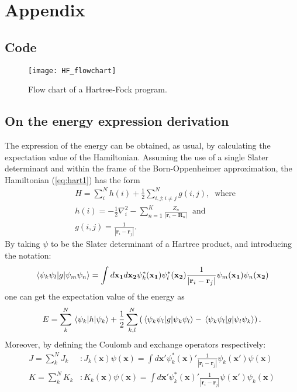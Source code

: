 \newpage
\appendix
\section*{Appendix}
\renewcommand{\thesubsection}{\Roman{subsection}}
\subsection{Code}
\label{appendix:code}
\begin{figure}[H]
    \centering
    \texttt{[image: HF\_flowchart]}
    \caption{Flow chart of a Hartree-Fock program.}
    \label{fig:flowchart}
\end{figure}
\subsection{On the energy expression derivation}\label{appendix:energies}
The expression of the energy can be obtained, as usual, by calculating the expectation value of the Hamiltonian. Assuming the use of a single Slater determinant and within the frame of the Born-Oppenheimer approximation, the Hamiltonian (\ref{eq:hart1}) has the form
\begin{align}\label{eq:hamiltonian_derivation}
    &H=\sum_i^N h(i)+\frac{1}{2}\sum_{i,j;i\neq j}^Ng(i,j),\; \; \mathrm{where}\\
    &h(i)=-\frac{1}{2}\nabla_i^2-
\sum_{n=1}^K \frac{Z_n}{\left|\mathbf{r}_i -\mathbf{R}_n\right|}\; \; \mathrm{and}\nonumber\\
    &g(i,j) = \frac{1}{\left|\mathbf{r}_i -\mathbf{r}_j\right|}.\nonumber
\end{align}
By taking $\psi$ to be the Slater determinant of a Hartree product, and introducing the notation:
\begin{equation}
    \mel{\psi_k \psi_l}{g}{\psi_m\psi_n} = \int{d\mathbf{x_1}d\mathbf{x_2}\psi_k^*(\mathbf{x_1})\psi_l^*(\mathbf{x_2})\frac{1}{\left|\mathbf{r}_i -\mathbf{r}_j\right|}\psi_m(\mathbf{x_1})\psi_n(\mathbf{x_2})}
\end{equation}
one can get the expectation value of the energy as
\begin{equation}
    E = \sum_k^N\mel{\psi_k}{h}{\psi_k}+\frac{1}{2}\sum_{k,l}^N\left(\mel{\psi_k \psi_l}{g}{\psi_k\psi_l}-\mel{\psi_k \psi_l}{g}{\psi_l\psi_k}\right).
    \label{eq:unsimple_energy}
\end{equation}
Moreover, by defining the Coulomb and exchange operators respectively:
\begin{align}
    J=\sum_k^NJ_k& : J_k(\mathbf{x})\psi(\mathbf{x})=\int{d\mathbf{x}'\psi_k^*(\mathbf{x})' \frac{1}{\left|\mathbf{r}_i -\mathbf{r}_j\right|}\psi_k(\mathbf{x}')\psi(\mathbf{x})}\\
    K=\sum_k^NK_k& : K_k(\mathbf{x})\psi(\mathbf{x})=\int{d\mathbf{x}'\psi_k^*(\mathbf{x})'\frac{1}{\left|\mathbf{r}_i -\mathbf{r}_j\right|} \psi(\mathbf{x}')\psi_k(\mathbf{x})}
\end{align}
